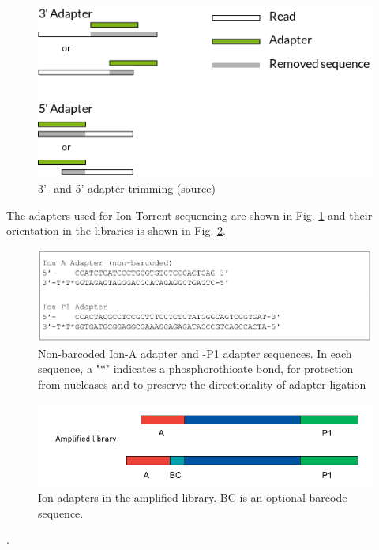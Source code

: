 \documentclass[11pt]{article}
\begin{document}
\begin{figure}[htb]
\centering
\includegraphics[width=14cm]{adapters.png}
\caption{3'- and 5'-adapter trimming (\href{http://cutadapt.readthedocs.org/en/latest/guide.html}{source})}
\end{figure}


The adapters used for Ion Torrent sequencing are shown in
Fig. \ref{fig:ionadapters} and their orientation in the libraries is shown
in Fig. \ref{fig:adapterorientations}.

\begin{figure}[htb]
\centering
\includegraphics[width=14cm]{IonAdapters.png}
\caption{\label{fig:ionadapters}Non-barcoded Ion-A adapter and -P1 adapter sequences. In each sequence, a "*" indicates a phosphorothioate bond, for protection from nucleases and to preserve the directionality of adapter ligation}
\end{figure}

\begin{figure}[htb]
\centering
\includegraphics[width=14cm]{IonLibraryWithAdapters.png}
\caption{\label{fig:adapterorientations}Ion adapters in the amplified library. BC is an optional barcode sequence.}
\end{figure}.
\end{document}

